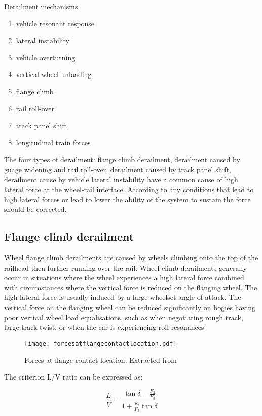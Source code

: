 Derailment mechanisms
\begin{enumerate}
    \item vehicle resonant response
    \item lateral instability
    \item vehicle overturning
    \item vertical wheel unloading
    \item flange climb
    \item rail roll-over
    \item track panel shift
    \item longitudinal train forces
\end{enumerate}

The four types of derailment: flange climb derailment, derailment caused by guage widening and rail roll-over, derailment caused by track panel shift, derailment cause by vehicle lateral instability have a common cause of high lateral force at the wheel-rail interface. According to \citet[Chapter 8, IV]{iwnicki2006handbook} any conditions that lead to high lateral forces or lead to lower the ability of the system to sustain the force should be corrected. 

\subsection{Flange climb derailment}
Wheel flange climb derailments are caused by wheels climbing onto the top of the railhead then further running over the rail. Wheel climb derailments generally occur in situations where the wheel experiences a high lateral force combined with circumstances where the vertical force is reduced on the flanging wheel. The high lateral force is usually induced by a large wheelset angle-of-attack. The vertical force on the flanging wheel can be reduced significantly on bogies having poor vertical wheel load equalisations, such as when negotiating rough track, large track twist, or when the car is experiencing roll resonances. 

\begin{figure}[h]
    \centering
    \texttt{[image: forcesatflangecontactlocation.pdf]}
    \caption{Forces at flange contact location. Extracted from \citet[Figure8.4]{iwnicki2006handbook}}
    \label{fig:forcesatflangecontactlocation}
\end{figure}

The criterion L/V ratio can be expressed as:

\begin{equation}
    \frac{L}{V}=\frac{\tan \delta -\frac{F_2}{F_3}}{1+\frac{F_2}{F_3}\tan \delta}
\end{equation}

